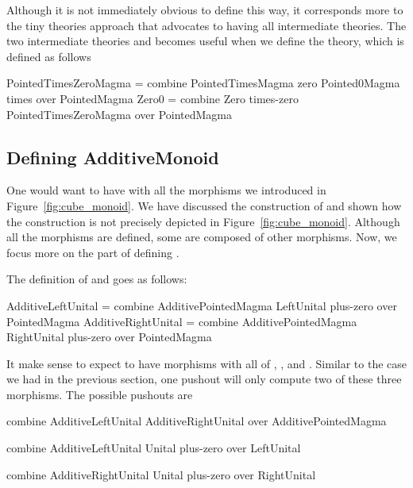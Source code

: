 Although it is not immediately obvious to define  this way, it corresponds more to the tiny theories approach that advocates to having all intermediate theories. The two intermediate theories  and  becomes useful when we define the  theory, which is defined as follows 
\begin{togcode}
PointedTimesZeroMagma = 
  combine PointedTimesMagma zero Pointed0Magma times 
  over PointedMagma 
Zero0 = 
  combine Zero times-zero PointedTimesZeroMagma {} 
  over PointedMagma 
\end{togcode}

\subsection{Defining AdditiveMonoid}
One would want to have  with all the morphisms we introduced in Figure~\ref{fig:cube_monoid}. %
We have discussed the construction of  and shown how the construction is not precisely depicted in Figure~\ref{fig:cube_monoid}. Although all the morphisms are defined, some are composed of other morphisms. Now, we focus more on the part of defining . 

\noindent The definition of  and  goes as follows: 
\begin{togcode}
AdditiveLeftUnital = 
  combine AdditivePointedMagma {} LeftUnital plus-zero 
  over PointedMagma
AdditiveRightUnital = 
  combine AdditivePointedMagma {} RightUnital plus-zero 
  over PointedMagma
\end{togcode} 
\noindent It make sense to expect  to have morphisms with all of , , and . Similar to the case we had in the previous section, one pushout will only compute two of these three morphisms. The possible pushouts are 
\begin{togcode}
combine AdditiveLeftUnital {} AdditiveRightUnital {} 
over AdditivePointedMagma
\end{togcode}

\begin{togcode}
combine AdditiveLeftUnital {} Unital plus-zero 
over LeftUnital 
\end{togcode}

\begin{togcode}
combine AdditiveRightUnital {} Unital plus-zero 
over RightUnital 
\end{togcode}

